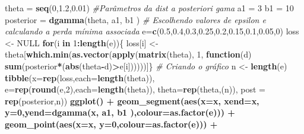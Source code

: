\documentclass[
]{book}
\newenvironment{Shaded}{\begin{snugshade}}{\end{snugshade}}
\newcommand{\CommentTok}[1]{\textcolor[rgb]{0.56,0.35,0.01}{\textit{#1}}}
\newcommand{\ControlFlowTok}[1]{\textcolor[rgb]{0.13,0.29,0.53}{\textbf{#1}}}
\newcommand{\DataTypeTok}[1]{\textcolor[rgb]{0.13,0.29,0.53}{#1}}
\newcommand{\DecValTok}[1]{\textcolor[rgb]{0.00,0.00,0.81}{#1}}
\newcommand{\FloatTok}[1]{\textcolor[rgb]{0.00,0.00,0.81}{#1}}
\newcommand{\KeywordTok}[1]{\textcolor[rgb]{0.13,0.29,0.53}{\textbf{#1}}}
\newcommand{\NormalTok}[1]{#1}
\newcommand{\OperatorTok}[1]{\textcolor[rgb]{0.81,0.36,0.00}{\textbf{#1}}}
\newcommand{\OtherTok}[1]{\textcolor[rgb]{0.56,0.35,0.01}{#1}}
\newcommand{\StringTok}[1]{\textcolor[rgb]{0.31,0.60,0.02}{#1}}
\begin{document}
\begin{Shaded}
\begin{Highlighting}[]
\NormalTok{theta =}\StringTok{ }\KeywordTok{seq}\NormalTok{(}\DecValTok{0}\NormalTok{,}\FloatTok{1.2}\NormalTok{,}\FloatTok{0.01}\NormalTok{)}
\CommentTok{#Parâmetros da dist a posteriori gama}
\NormalTok{a1 =}\StringTok{ }\DecValTok{3}
\NormalTok{b1 =}\StringTok{ }\DecValTok{10}
\NormalTok{posterior =}\StringTok{ }\KeywordTok{dgamma}\NormalTok{(theta, a1, b1 )}
\CommentTok{# Escolhendo valores de epsilon e calculando a perda mínima associada}
\NormalTok{e=}\KeywordTok{c}\NormalTok{(}\FloatTok{0.5}\NormalTok{,}\FloatTok{0.4}\NormalTok{,}\FloatTok{0.3}\NormalTok{,}\FloatTok{0.25}\NormalTok{,}\FloatTok{0.2}\NormalTok{,}\FloatTok{0.15}\NormalTok{,}\FloatTok{0.1}\NormalTok{,}\FloatTok{0.05}\NormalTok{,}\DecValTok{0}\NormalTok{)}
\NormalTok{loss <-}\StringTok{ }\OtherTok{NULL}
\ControlFlowTok{for}\NormalTok{(i }\ControlFlowTok{in} \DecValTok{1}\OperatorTok{:}\KeywordTok{length}\NormalTok{(e))\{}
\NormalTok{  loss[i] <-}\StringTok{ }\NormalTok{theta[}\KeywordTok{which.min}\NormalTok{(}\KeywordTok{as.vector}\NormalTok{(}\KeywordTok{apply}\NormalTok{(}\KeywordTok{matrix}\NormalTok{(theta), }\DecValTok{1}\NormalTok{,}
                                              \ControlFlowTok{function}\NormalTok{(d) }\KeywordTok{sum}\NormalTok{(posterior}\OperatorTok{*}\NormalTok{(}\KeywordTok{abs}\NormalTok{(theta}\OperatorTok{-}\NormalTok{d)}\OperatorTok{>}\NormalTok{e[i])))))]\}}
\CommentTok{# Criando o gráfico }
\NormalTok{n <-}\StringTok{ }\KeywordTok{length}\NormalTok{(e)}
\KeywordTok{tibble}\NormalTok{(}\DataTypeTok{x=}\KeywordTok{rep}\NormalTok{(loss,}\DataTypeTok{each=}\KeywordTok{length}\NormalTok{(theta)),}
       \DataTypeTok{e=}\KeywordTok{rep}\NormalTok{(}\KeywordTok{round}\NormalTok{(e,}\DecValTok{2}\NormalTok{),}\DataTypeTok{each=}\KeywordTok{length}\NormalTok{(theta)),}
       \DataTypeTok{theta=}\KeywordTok{rep}\NormalTok{(theta,(n)), }\DataTypeTok{post =} \KeywordTok{rep}\NormalTok{(posterior,n)) }\OperatorTok{%
\StringTok{  }\KeywordTok{ggplot}\NormalTok{() }\OperatorTok{+}\StringTok{ }
\StringTok{  }\KeywordTok{geom_segment}\NormalTok{(}\KeywordTok{aes}\NormalTok{(}\DataTypeTok{x=}\NormalTok{x, }\DataTypeTok{xend=}\NormalTok{x, }\DataTypeTok{y=}\DecValTok{0}\NormalTok{,}\DataTypeTok{yend=}\KeywordTok{dgamma}\NormalTok{(x, a1, b1 ),}\DataTypeTok{colour=}\KeywordTok{as.factor}\NormalTok{(e))) }\OperatorTok{+}
\StringTok{  }\KeywordTok{geom_point}\NormalTok{(}\KeywordTok{aes}\NormalTok{(}\DataTypeTok{x=}\NormalTok{x, }\DataTypeTok{y=}\DecValTok{0}\NormalTok{,}\DataTypeTok{colour=}\KeywordTok{as.factor}\NormalTok{(e))) }\OperatorTok{+}
}
\end{Highlighting}
\end{Shaded}
\end{document}

